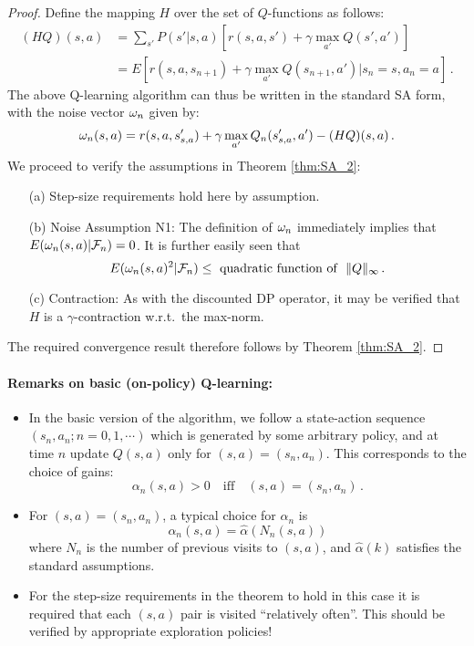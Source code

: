 \begin{proof}
Define the mapping $H$ over the set of $Q$-functions as follows:
\begin{align*}
(H Q) (s,a) & = \sum_{s'} P(s'|s,a) [r(s, a,s') + \gamma \max_{a'} Q(s',{a'})]\\
& = E[r(s,a,s_{n+1}) + \gamma \max_{a'} Q(s_{n+1},{a'})|s_n=s,a_n=a]\,.
\end{align*}
The above Q-learning algorithm can thus be written in the standard SA form,
with the noise vector $\omega_n$ given by:
$$
\omega_n(s,a) = r(s,a,s'_{s,a}) + \gamma \max_{a'} Q_n (s'_{s,a}, {a'}) -
(HQ) (s,a)
\,.
$$
We proceed to verify the assumptions in Theorem \ref{thm:SA_2}:
\begin{itemize}
\item[(a)]
Step-size requirements hold here by assumption.
\item[(b)]
Noise Assumption N1:
The definition of $\omega_n$ immediately implies that
$ E (\omega_n(s,a) | \mathcal F_n) = 0$.
It is further easily seen that
$$
E (\omega_n(s,a)^2 | \mathcal F_n) \le \text{ quadratic function of \ }
\|Q\|_{\infty}\,.
$$
\item[(c)]
Contraction:
As with the discounted DP operator, it may be verified that $H$ is a
$\gamma$-contraction w.r.t.\ the max-norm.
\end{itemize}
The required convergence result therefore follows by Theorem \ref{thm:SA_2}.
\end{proof}



\paragraph{Remarks on basic (on-policy) Q-learning:}
\begin{itemize}
\item
In the basic version of the algorithm, we follow a state-action sequence
$(s_n, a_n; n=0,1,\cdots)$ which is generated by some arbitrary policy,
and at time $n$ update $Q(s, a)$ only for $(s,a)=(s_n,a_n)$.
This corresponds to the choice of gains:
$$
\alpha_n(s,a) > 0 \quad \text{iff} \quad
(s,a) = (s_n, a_n)
\,.
$$
\item
For $(s,a)= (s_n, a_n)$, a typical choice for $\alpha_n$ is
$$
\alpha_n(s,a) = \hat\alpha(N_n (s,a))
$$
where $N_n$ is the number of previous visits to $(s,a)$, and
$\hat\alpha(k)$ satisfies the standard assumptions.
\item
For the step-size requirements in the theorem to hold in this case it is
required that each $(s,a)$ pair is visited ``relatively often''.
This should be verified by appropriate exploration policies!
\end{itemize}

